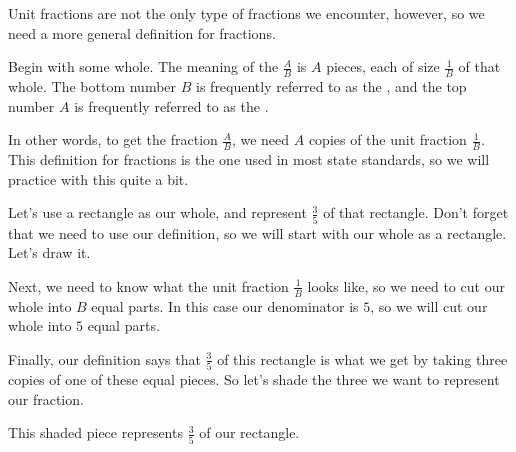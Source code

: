 \documentclass{ximera}
\begin{document}
Unit fractions are not the only type of fractions we encounter, however, so we need a more general definition for fractions.

\begin{definition}
	Begin with some whole. The meaning of the  $\frac{A}{B}$ is $A$ pieces, each of size $\frac{1}{B}$ of that whole. The bottom number $B$ is frequently referred to as the , and the top number $A$ is frequently referred to as the .
\end{definition}
In other words, to get the fraction $\frac{A}{B}$, we need $A$ copies of the unit fraction $\frac{1}{B}$. This definition for fractions is the one used in most state standards, so we will practice with this quite a bit.

\begin{example}
Let's use a rectangle as our whole, and represent $\frac{3}{5}$ of that rectangle. Don't forget that we need to use our definition, so we will start with our whole as a rectangle. Let's draw it.

\begin{center}
\end{center}

Next, we need to know what the unit fraction $\frac{1}{B}$ looks like, so we need to cut our whole into $B$ equal parts. In this case our denominator is $5$, so we will cut our whole into $5$ equal parts.

\begin{center}
\end{center}

Finally, our definition says that $\frac{3}{5}$ of this rectangle is what we get by taking three copies of one of these equal pieces. So let's shade the three we want to represent our fraction.

\begin{center}
\end{center}

This shaded piece represents $\frac{3}{5}$ of our rectangle.

\end{example}
\end{document}
